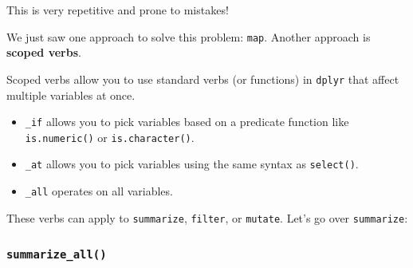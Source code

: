 \documentclass[]{book}
\newenvironment{Shaded}{\begin{snugshade}}{\end{snugshade}}
\newcommand{\KeywordTok}[1]{\textcolor[rgb]{0.13,0.29,0.53}{\textbf{#1}}}
\newcommand{\DataTypeTok}[1]{\textcolor[rgb]{0.13,0.29,0.53}{#1}}
\newcommand{\StringTok}[1]{\textcolor[rgb]{0.31,0.60,0.02}{#1}}
\newcommand{\CommentTok}[1]{\textcolor[rgb]{0.56,0.35,0.01}{\textit{#1}}}
\newcommand{\OperatorTok}[1]{\textcolor[rgb]{0.81,0.36,0.00}{\textbf{#1}}}
\newcommand{\NormalTok}[1]{#1}
\providecommand{\tightlist}{%
  \setlength{\itemsep}{0pt}\setlength{\parskip}{0pt}}
\begin{document}
\begin{Shaded}
\end{Shaded}

This is very repetitive and prone to mistakes!

We just saw one approach to solve this problem: \texttt{map}. Another
approach is \textbf{scoped verbs}.

Scoped verbs allow you to use standard verbs (or functions) in
\texttt{dplyr} that affect multiple variables at once.

\begin{itemize}
\tightlist
\item
  \texttt{\_if} allows you to pick variables based on a predicate
  function like \texttt{is.numeric()} or \texttt{is.character()}.
\item
  \texttt{\_at} allows you to pick variables using the same syntax as
  \texttt{select()}.
\item
  \texttt{\_all} operates on all variables.
\end{itemize}

These verbs can apply to \texttt{summarize}, \texttt{filter}, or
\texttt{mutate}. Let's go over \texttt{summarize}:

\subsubsection*{\texorpdfstring{\texttt{summarize\_all()}}{summarize\_all()}}\label{summarize_all}
\end{document}
